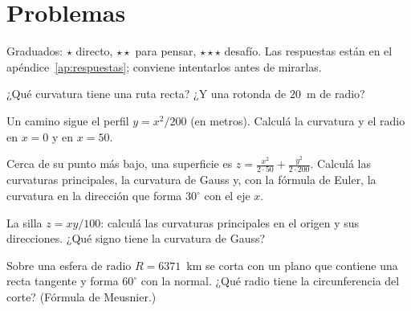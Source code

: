 \section{Problemas}\label{sec:problemas-13}

Graduados: \({\star}\) directo, \({\star}{\star}\) para pensar, \({\star}{\star}{\star}\) desafío. Las respuestas están en el apéndice~\ref{ap:respuestas}; conviene intentarlos antes de mirarlas.

\begin{problema}[\({\star}\)]\label{pb:13-1}
¿Qué curvatura tiene una ruta recta? ¿Y una rotonda de \(20\)~m de radio?
\end{problema}

\begin{problema}[\({\star}{\star}\)]\label{pb:13-2}
Un camino sigue el perfil \(y=x^2/200\) (en metros). Calculá la curvatura y el radio en \(x=0\) y en \(x=50\).
\end{problema}

\begin{problema}[\({\star}{\star}\)]\label{pb:13-3}
Cerca de su punto más bajo, una superficie es \(z=\frac{x^2}{2\cdot50}+\frac{y^2}{2\cdot200}\). Calculá las curvaturas principales, la curvatura de Gauss y, con la fórmula de Euler, la curvatura en la dirección que forma \(30^\circ\) con el eje \(x\).
\end{problema}

\begin{problema}[\({\star}{\star}\)]\label{pb:13-4}
La silla \(z=xy/100\): calculá las curvaturas principales en el origen y sus direcciones. ¿Qué signo tiene la curvatura de Gauss?
\end{problema}

\begin{problema}[\({\star}{\star}{\star}\)]\label{pb:13-5}
Sobre una esfera de radio \(R=6371\)~km se corta con un plano que contiene una recta tangente y forma \(60^\circ\) con la normal. ¿Qué radio tiene la circunferencia del corte? (Fórmula de Meusnier.)
\end{problema}
